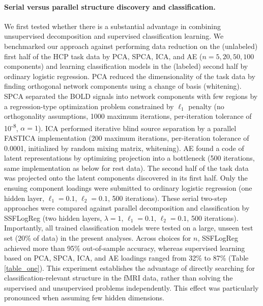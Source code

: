 \documentclass{article} %
\begin{document}
\paragraph{Serial versus parallel structure discovery and classification.}
We first tested whether there is a substantial advantage in combining unsupervised decomposition
and supervised classification learning.
We benchmarked our approach against
performing data reduction on the (unlabeled)
first half of the HCP task data by PCA, SPCA, ICA, and
AE ($n=5, 20, 50, 100$ components)
and learning classification models in the (labeled) second half
by ordinary logistic regression.
%
PCA reduced the dimensionality of the task data by
finding orthogonal network components using a change of basis
(whitening).
%
SPCA separated the BOLD signals into
network components with few regions by
a regression-type optimization problem constrained by
$\ell_1$ penalty
(no orthogonality assumptions, 1000 maximum iterations,
per-iteration tolerance of 10\textsuperscript{-8},
$\alpha=1$).
%
ICA performed iterative blind source separation
by a parallel FASTICA implementation (200 maximum iterations,
per-iteration tolerance of 0.0001,
initialized by random mixing matrix, whitening).
%
AE found a code of latent representations by optimizing projection
into a bottleneck
(500 iterations, same implementation as below for rest data).
%
The second half of the task data was projected onto the
latent components discovered in its first half.
Only the ensuing component loadings were submitted to ordinary
logistic regression
(one hidden layer, $\ell_1=0.1$, $\ell_2=0.1$, 500 iterations).
%
These serial two-step approaches were
compared against parallel decomposition and classification by SSFLogReg
(two hidden layers, $\lambda=1$, $\ell_1=0.1$, $\ell_2=0.1$,
500 iterations).
Importantly, all trained classification models were tested
on a large, unseen test set (20\% of data) in the present analyses.
%
Across choices for $n$, SSFLogReg
achieved more than 95\% out-of-sample accuracy, whereas
supervised learning based on PCA, SPCA, ICA, and AE loadings
ranged from 32\% to 87\%
(Table \ref{table_one}).
%
This experiment establishes the advantage of directly searching for
classification-relevant structure in the fMRI data,
rather than solving the supervised and unsupervised problems independently.
This effect was particularly pronounced when assuming few hidden dimensions.
\end{document}
